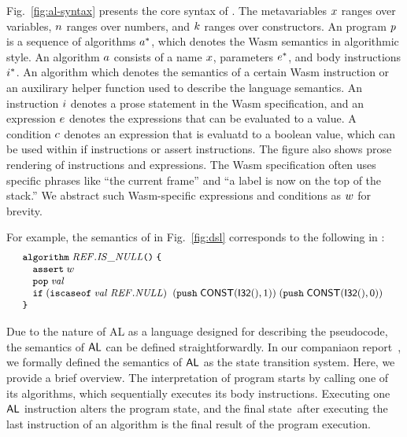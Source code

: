 Fig.~\ref{fig:al-syntax} presents the core syntax of \al.
The metavariables $x$ ranges over variables,
$n$ ranges over numbers, and
$k$ ranges over constructors.
An \al program $p$ is a sequence of algorithms $a^*$,
which denotes the Wasm semantics in algorithmic style.
An algorithm $a$ consists of a name $x$, parameters $e^*$,
and body instructions $i^*$. An algorithm which denotes the semantics of a
certain Wasm instruction or an auxilirary helper function used to describe the language semantics.
An instruction $i$ denotes a prose statement in the Wasm specification,
and an expression $e$ denotes the expressions that can be evaluated to a value.
A condition $c$ denotes an expression that is evaluatd to a boolean value, which can
be used within if instructions or assert instructions.
The figure also shows prose rendering of instructions and expressions.
The Wasm specification often uses specific phrases like ``the current frame'' and
``a label is now on the top of the stack.''
We abstract such Wasm-specific expressions and conditions as $w$ for brevity.

For example, the semantics of 
in Fig.~\ref{fig:dsl} corresponds to the following in \al:
\[
\small
\!\!
\begin{array}{l}
\texttt{\small algorithm} \; \mathit{REF.IS\_NULL} \texttt{\small (} \texttt{\small )} \; \texttt{\small \{} \\
\quad \texttt{\small assert} \; w \\
\quad \texttt{\small pop} \; \mathit{val}\\
\quad \texttt{\small if} \; (\texttt{\small iscaseof} \; \mathit{val} \; \mathit{REF.NULL})\;
\; (\texttt{\small push} \; \mathsf{CONST}(\mathsf{I32}(), 1)) \; (\texttt{\small push} \; \mathsf{CONST}(\mathsf{I32}(), 0))\\
\texttt{\small \}}
\end{array}
\]

Due to the nature of AL as a language designed for describing the pseudocode,
the semantics of $\textsf{AL}$ can be defined straightforwardly.
In our companiaon report~\cite{il-tr}, we formally defined the semantics of $\textsf{AL}$ as the state transition system.
Here, we provide a brief overview.
The interpretation of program starts by calling one of its algorithms,
which sequentially executes its body instructions.
Executing one $\textsf{AL}$ instruction alters the program state,
and the final state after executing the last instruction of an algorithm
is the final result of the program execution.

